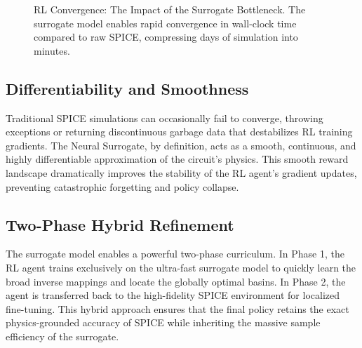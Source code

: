 \documentclass[11pt, a4paper]{article}
\begin{document}
\begin{figure}[!htbp]
    \centering
    \caption{RL Convergence: The Impact of the Surrogate Bottleneck. The surrogate model enables rapid convergence in wall-clock time compared to raw SPICE, compressing days of simulation into minutes.}
    \label{fig:convergence}
\end{figure}

\subsection*{Differentiability and Smoothness}
Traditional SPICE simulations can occasionally fail to converge, throwing exceptions or returning discontinuous garbage data that destabilizes RL training gradients. The Neural Surrogate, by definition, acts as a smooth, continuous, and highly differentiable approximation of the circuit's physics. This smooth reward landscape dramatically improves the stability of the RL agent's gradient updates, preventing catastrophic forgetting and policy collapse.

\subsection*{Two-Phase Hybrid Refinement}
The surrogate model enables a powerful two-phase curriculum. In Phase 1, the RL agent trains exclusively on the ultra-fast surrogate model to quickly learn the broad inverse mappings and locate the globally optimal basins. In Phase 2, the agent is transferred back to the high-fidelity SPICE environment for localized fine-tuning. This hybrid approach ensures that the final policy retains the exact physics-grounded accuracy of SPICE while inheriting the massive sample efficiency of the surrogate.
\end{document}
